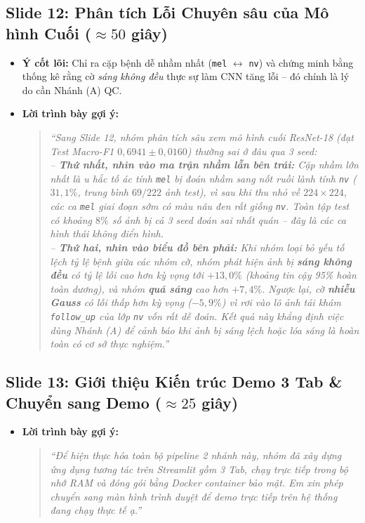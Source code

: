 \documentclass[11pt,a4paper]{article}
\begin{document}
\subsection*{Slide 12: Phân tích Lỗi Chuyên sâu của Mô hình Cuối ($\approx 50$ giây)}
\begin{itemize}
    \item \textbf{Ý cốt lõi:} Chỉ ra cặp bệnh dễ nhầm nhất (\texttt{mel} $\leftrightarrow$ \texttt{nv}) và chứng minh bằng thống kê rằng cờ \emph{sáng không đều} thực sự làm CNN tăng lỗi -- đó chính là lý do cần Nhánh (A) QC.
    \item \textbf{Lời trình bày gợi ý:}
    \begin{quote}
    \emph{``Sang Slide 12, nhóm phân tích sâu xem mô hình cuối ResNet-18 (đạt Test Macro-F1 $0{,}6941 \pm 0{,}0160$) thường sai ở đâu qua 3 seed:\\
    -- \textbf{Thứ nhất, nhìn vào ma trận nhầm lẫn bên trái:} Cặp nhầm lớn nhất là u hắc tố ác tính \texttt{mel} bị đoán nhầm sang nốt ruồi lành tính \texttt{nv} ($31{,}1\%$, trung bình $69/222$ ảnh test), vì sau khi thu nhỏ về $224\times 224$, các ca \texttt{mel} giai đoạn sớm có màu nâu đen rất giống \texttt{nv}. Toàn tập test có khoảng $8\%$ số ảnh bị cả 3 seed đoán sai nhất quán -- đây là các ca hình thái không điển hình.\\
    -- \textbf{Thứ hai, nhìn vào biểu đồ bên phải:} Khi nhóm loại bỏ yếu tố lệch tỷ lệ bệnh giữa các nhóm cờ, nhóm phát hiện ảnh bị \textbf{sáng không đều} có tỷ lệ lỗi cao hơn kỳ vọng tới $+13{,}0\%$ (khoảng tin cậy 95\% hoàn toàn dương), và nhóm \textbf{quá sáng} cao hơn $+7{,}4\%$. Ngược lại, cờ \textbf{nhiễu Gauss} có lỗi thấp hơn kỳ vọng ($-5{,}9\%$) vì rơi vào lô ảnh tái khám \texttt{follow\_up} của lớp \texttt{nv} vốn rất dễ đoán. Kết quả này khẳng định việc dùng Nhánh (A) để cảnh báo khi ảnh bị sáng lệch hoặc lóa sáng là hoàn toàn có cơ sở thực nghiệm.''}
    \end{quote}
\end{itemize}

\subsection*{Slide 13: Giới thiệu Kiến trúc Demo 3 Tab \& Chuyển sang Demo ($\approx 25$ giây)}
\begin{itemize}
    \item \textbf{Lời trình bày gợi ý:}
    \begin{quote}
    \emph{``Để hiện thực hóa toàn bộ pipeline 2 nhánh này, nhóm đã xây dựng ứng dụng tương tác trên Streamlit gồm 3 Tab, chạy trực tiếp trong bộ nhớ RAM và đóng gói bằng Docker container bảo mật. Em xin phép chuyển sang màn hình trình duyệt để demo trực tiếp trên hệ thống đang chạy thực tế ạ.''}
    \end{quote}
\end{itemize}
\end{document}
